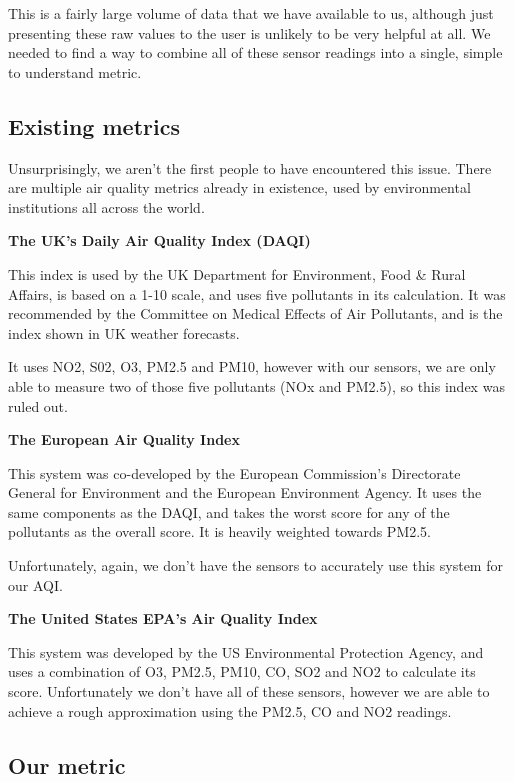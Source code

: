 \documentclass[sigconf, nonacm]{acmart}
\begin{document}
This is a fairly large volume of data that we have available to us\cite{wiki_aqi}, although just presenting
these raw values to the user is unlikely to be very helpful at all. We needed to find a way to 
combine all of these sensor readings into a single, simple to understand metric.

\subsection{Existing metrics}

Unsurprisingly, we aren't the first people to have encountered this issue. There are multiple
air quality metrics already in existence, used by environmental institutions all across the world.

\textbf{The UK's Daily Air Quality Index (DAQI)} \cite{defra_aqi}

This index is used by the UK Department for Environment, Food \& Rural Affairs, is based on a 1-10
scale, and uses five pollutants in its calculation. It was recommended by the Committee on Medical 
Effects of Air Pollutants, and is the index shown in UK weather forecasts.

It uses NO2, S02, O3, PM2.5 and PM10, however with our sensors, we are only able to measure
two of those five pollutants (NOx and PM2.5), so this index was ruled out.

\textbf{The European Air Quality Index} \cite{euro_aqi}

This system was co-developed by the European Commission's Directorate General for Environment and
the European Environment Agency. It uses the same components as the DAQI, and takes the worst score 
for any of the pollutants as the overall score. It is heavily weighted towards PM2.5.

Unfortunately, again, we don't have the sensors to accurately use this system for our AQI.

\textbf{The United States EPA's Air Quality Index} \cite{airnow_aqi}

This system was developed by the US Environmental Protection Agency, and uses a combination of
O3, PM2.5, PM10, CO, SO2 and NO2 to calculate its score. Unfortunately we don't have all of these
sensors, however we are able to achieve a rough approximation using the PM2.5, CO and NO2 readings.

\subsection{Our metric}
\end{document}
